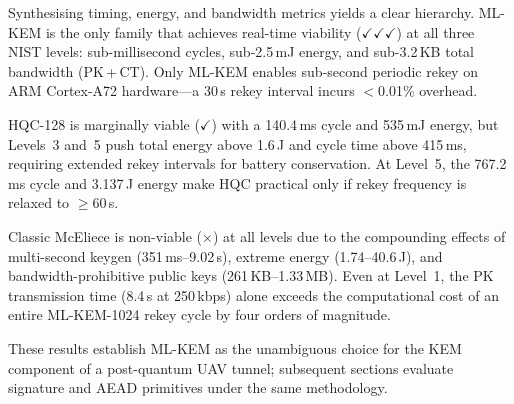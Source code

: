 Synthesising timing, energy, and bandwidth metrics yields a clear
hierarchy.  ML-KEM is the only family that achieves real-time
viability ($\checkmark\!\checkmark\!\checkmark$) at all three NIST
levels: sub-millisecond cycles, sub-2.5\,mJ energy, and
sub-3.2\,KB total bandwidth (PK\,+\,CT).  Only ML-KEM enables
sub-second periodic rekey on ARM Cortex-A72 hardware---a 30\,s
rekey interval incurs $<$0.01\% overhead.

HQC-128 is marginally viable ($\checkmark$) with a 140.4\,ms cycle
and 535\,mJ energy, but Levels~3 and~5 push total energy above 1.6\,J
and cycle time above 415\,ms, requiring extended rekey intervals for
battery conservation.  At Level~5, the 767.2\,ms cycle and 3.137\,J
energy make HQC practical only if rekey frequency is relaxed to
$\geq$60\,s.

Classic McEliece is non-viable ($\times$) at all levels due to the
compounding effects of multi-second keygen (351\,ms--9.02\,s), extreme
energy (1.74--40.6\,J), and bandwidth-prohibitive public keys
(261\,KB--1.33\,MB).  Even at Level~1, the PK transmission time
(8.4\,s at 250\,kbps) alone exceeds the computational cost of an
entire ML-KEM-1024 rekey cycle by four orders of magnitude.

These results establish ML-KEM as the unambiguous choice for the
KEM component of a post-quantum UAV tunnel; subsequent sections
evaluate signature and AEAD primitives under the same methodology.
